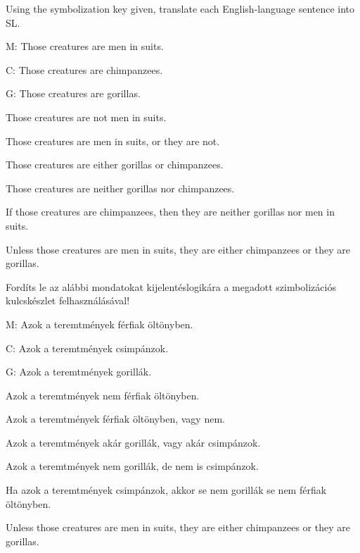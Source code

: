\practiceproblems

\solutions
\problempart Using the symbolization key given, translate each English-language sentence into SL.
\label{pr.monkeysuits}
\begin{ekey}
\item[M:] Those creatures are men in suits. 
\item[C:] Those creatures are chimpanzees. 
\item[G:] Those creatures are gorillas.
\end{ekey}
\begin{earg}
\item Those creatures are not men in suits.
\item Those creatures are men in suits, or they are not.
\item Those creatures are either gorillas or chimpanzees.
\item Those creatures are neither gorillas nor chimpanzees.
\item If those creatures are chimpanzees, then they are neither gorillas nor men in suits.
\item Unless those creatures are men in suits, they are either chimpanzees or they are gorillas.
\end{earg}

\solutions
\problempart Fordíts le az alábbi mondatokat kijelentéslogikára a megadott szimbolizációs kulcskészlet felhasználásával!
\label{pr.monkeysuits}
\begin{ekey}
\item[M:] Azok a teremtmények férfiak öltönyben.
\item[C:] Azok a teremtmények csimpánzok.
\item[G:] Azok a teremtmények gorillák.
\end{ekey}
\begin{earg}
\item Azok a teremtmények nem férfiak öltönyben.
\item Azok a teremtmények férfiak öltönyben, vagy nem.
\item Azok a teremtmények akár gorillák, vagy akár csimpánzok.
\item Azok a teremtmények nem gorillák, de nem is csimpánzok.
\item Ha azok a teremtmények csimpánzok, akkor se nem gorillák se nem férfiak öltönyben.
\item Unless those creatures are men in suits, they are either chimpanzees or they are gorillas.
\end{earg}

